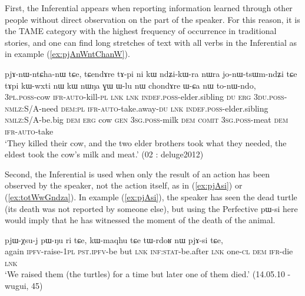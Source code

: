 \documentclass[oldfontcommands,oneside,a4paper,11pt]{article}
\newcommand{\ipa}[1]{{\phon \mbox{#1}}} %
\newcommand{\refb}[1]{(\ref{#1})}
\begin{document}
First, the Inferential appears when reporting information learned through other people without direct observation on the part of the speaker. For this reason, it is the TAME category with the highest frequency of occurrence in traditional stories, and one can find long stretches of text with all verbs in the Inferential as in example \refb{ex:pjAnWntChanW}.

\begin{exe}
\ex \label{ex:pjAnWntChanW}
\gll  \ipa{nɯ-nɯŋa} 	\ipa{pjɤ-nɯ-ntɕha-nɯ} 	\ipa{tɕe,} \ipa{tɕendɤre} 	\ipa{tɤ-pi} 	\ipa{ni} 	\ipa{kɯ} 	\ipa{ndʑi-kɯ-ra} 	\ipa{nɯra} 	\ipa{jo-nɯ-tsɯm-ndʑi} 	\ipa{tɕe} \ipa{tɤpi} 	\ipa{kɯ-wxti} 	\ipa{nɯ} 	\ipa{kɯ} 	\ipa{nɯŋa} 	\ipa{ɣɯ} 	 \ipa{ɯ-lu} 	\ipa{nɯ} 	\ipa{chondɤre} \ipa{ɯ-ɕa} 	\ipa{nɯ} 	\ipa{to-nɯ-ndo,} \\
\textsc{3pl.poss}-cow \textsc{ifr}-\textsc{auto}-kill-\textsc{pl} \textsc{lnk}  \textsc{lnk} \textsc{indef.poss}-elder.sibling \textsc{du} \textsc{erg} \textsc{3du.poss}-\textsc{nmlz}:S/A-need \textsc{dem:pl} \textsc{ifr}-\textsc{auto}-take.away-\textsc{du} \textsc{lnk} \textsc{indef.poss}-elder.sibling \textsc{nmlz}:S/A-be.big \textsc{dem} \textsc{erg} cow \textsc{gen} \textsc{3sg.poss}-milk \textsc{dem} \textsc{comit}  \textsc{3sg.poss}-meat  \textsc{dem} \textsc{ifr}-\textsc{auto}-take \\
\glt `They killed their cow, and the two elder brothers took what they needed, the eldest took the cow's milk and meat.' (02 : deluge2012)
\end{exe}



Second, the Inferential is used when only the result of an action has been observed by the speaker, not the action itself, as in \refb{ex:pjAsi} or \refb{ex:totWwGndza}. In example \refb{ex:pjAsi}, the speaker has seen the dead turtle (its death was not reported by someone else), but using the Perfective \ipa{pɯ-si}  here would imply that he has witnessed the moment of the death of the animal. 

\begin{exe}
\ex  \label{ex:pjAsi}
\gll \ipa{li} 	\ipa{pjɯ-χsu-j} 	\ipa{pɯ-ŋu} 	\ipa{ri} 	\ipa{tɕe,} \ipa{kɯ-maqhu} 	\ipa{tɕe} 	\ipa{tɯ-rdoʁ} 	\ipa{nɯ} 	\ipa{pjɤ-si} 	\ipa{tɕe,} \\
again \textsc{ipfv}-raise-\textsc{1pl} \textsc{pst.ipfv}-be but \textsc{lnk} \textsc{inf:stat}-be.after \textsc{lnk}  one-\textsc{cl} \textsc{dem} \textsc{ifr}-die \textsc{lnk} \\
\glt `We raised them (the turtles) for a time but later one of them died.' (14.05.10 - wugui, 45)
\end{exe}
\end{document}
